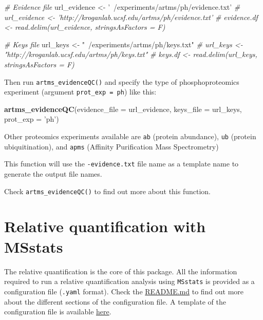 \documentclass[]{article}
\newenvironment{Shaded}{\begin{snugshade}}{\end{snugshade}}
\newcommand{\KeywordTok}[1]{\textcolor[rgb]{0.13,0.29,0.53}{\textbf{#1}}}
\newcommand{\DataTypeTok}[1]{\textcolor[rgb]{0.13,0.29,0.53}{#1}}
\newcommand{\StringTok}[1]{\textcolor[rgb]{0.31,0.60,0.02}{#1}}
\newcommand{\CommentTok}[1]{\textcolor[rgb]{0.56,0.35,0.01}{\textit{#1}}}
\newcommand{\NormalTok}[1]{#1}
\begin{document}
\begin{Shaded}
\begin{Highlighting}[]
\CommentTok{# Evidence file}
\NormalTok{url_evidence <-}\StringTok{ '~/experiments/artms/ph/evidence.txt'}
\CommentTok{# url_evidence <- 'http://kroganlab.ucsf.edu/artms/ph/evidence.txt'}
\CommentTok{# evidence.df <- read.delim(url_evidence, stringsAsFactors = F)}


\CommentTok{# Keys file}
\NormalTok{url_keys <-}\StringTok{ "~/experiments/artms/ph/keys.txt"}
\CommentTok{# url_keys <- "http://kroganlab.ucsf.edu/artms/ph/keys.txt"}
\CommentTok{# keys.df <- read.delim(url_keys, stringsAsFactors = F)}
\end{Highlighting}
\end{Shaded}

Then run \texttt{artms\_evidenceQC()} and specify the type of
phosphoproteomics experiment (argument \texttt{prot\_exp\ =\ ph}) like
this:

\begin{Shaded}
\begin{Highlighting}[]
\KeywordTok{artms_evidenceQC}\NormalTok{(}\DataTypeTok{evidence_file =}\NormalTok{ url_evidence, }\DataTypeTok{keys_file =}\NormalTok{ url_keys, }\DataTypeTok{prot_exp =} \StringTok{'ph'}\NormalTok{)}
\end{Highlighting}
\end{Shaded}

Other proteomics experiments available are \texttt{ab} (protein
abundance), \texttt{ub} (protein ubiquitination), and \texttt{apms}
(Affinity Purification Mass Spectrometry)

This function will use the \texttt{-evidence.txt} file name as a
template name to generate the output file names.

Check \texttt{artms\_evidenceQC()} to find out more about this function.

\section{Relative quantification with
MSstats}\label{relative-quantification-with-msstats}

The relative quantification is the core of this package. All the
information required to run a relative quantification analysis using
\texttt{MSstats} is provided as a configuration file (\texttt{.yaml}
format). Check the \href{../README.md}{README.md} to find out more about
the different sections of the configuration file. A template of the
configuration file is available
\href{../data-raw/artms_config.yaml}{here}.
\end{document}
